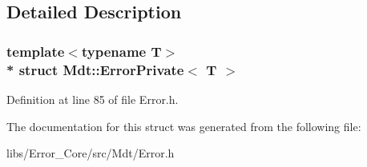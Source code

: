 \subsection{Detailed Description}
\subsubsection*{template$<$typename T$>$\\*
struct Mdt\+::\+Error\+Private$<$ T $>$}



Definition at line 85 of file Error.\+h.



The documentation for this struct was generated from the following file\+:\begin{DoxyCompactItemize}
\item 
libs/\+Error\+\_\+\+Core/src/\+Mdt/Error.\+h\end{DoxyCompactItemize}
